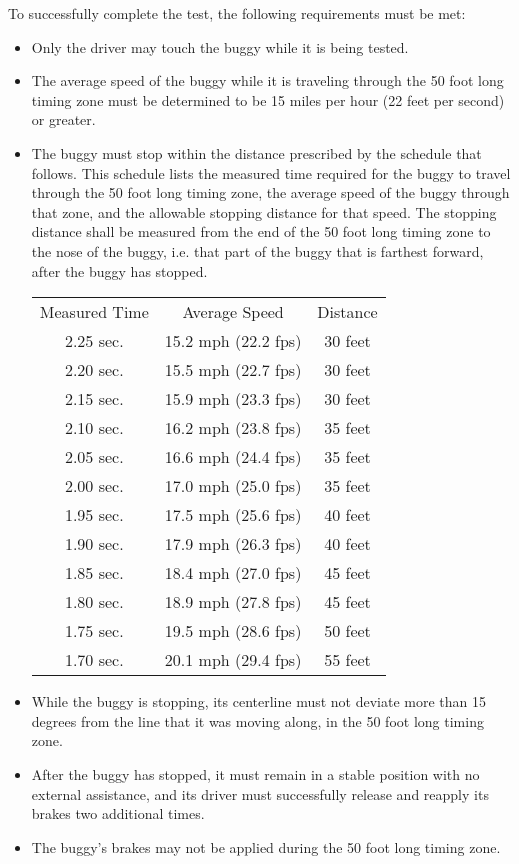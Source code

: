 	\noindent To successfully complete the test, the following requirements must be met:

	\begin{itemize}

		\item
		Only the driver may touch the buggy while it is being tested.

		\item
		The average speed of the buggy while it is traveling through the 50 foot long
		timing zone must be determined to be 15 miles per hour (22 feet per second) or
		greater.

		\item
		The buggy must stop within the distance prescribed by the schedule that
		follows. This schedule lists the measured time required for the buggy to travel
		through the 50 foot long timing zone, the average speed of the buggy through
		that zone, and the allowable stopping distance for that speed. The stopping
		distance shall be measured from the end of the 50 foot long timing zone to the
		nose of the buggy, i.e. that part of the buggy that is farthest forward, after
		the buggy has stopped.

			\begin{tabular}{c c c}
				Measured Time & Average Speed & Distance \\
				2.25 sec. & 15.2 mph (22.2 fps) & 30 feet\\
				2.20 sec. & 15.5 mph (22.7 fps) & 30 feet\\
				2.15 sec. & 15.9 mph (23.3 fps) & 30 feet\\
				2.10 sec. & 16.2 mph (23.8 fps) & 35 feet\\
				2.05 sec. & 16.6 mph (24.4 fps) & 35 feet\\
				2.00 sec. & 17.0 mph (25.0 fps) & 35 feet\\
				1.95 sec. & 17.5 mph (25.6 fps) & 40 feet\\
				1.90 sec. & 17.9 mph (26.3 fps) & 40 feet\\
				1.85 sec. & 18.4 mph (27.0 fps) & 45 feet\\
				1.80 sec. & 18.9 mph (27.8 fps) & 45 feet\\
				1.75 sec. & 19.5 mph (28.6 fps) & 50 feet\\
				1.70 sec. & 20.1 mph (29.4 fps) & 55 feet\\
			\end{tabular}

		\item
		While the buggy is stopping, its centerline must not deviate more than 15
		degrees from the line that it was moving along, in the 50 foot long timing
		zone.

		\item
		After the buggy has stopped, it must remain in a stable position with no
		external assistance, and its driver must successfully release and reapply its
		brakes two additional times.

		\item
		The buggy's brakes may not be applied during the 50 foot long timing zone.

	\end{itemize}

